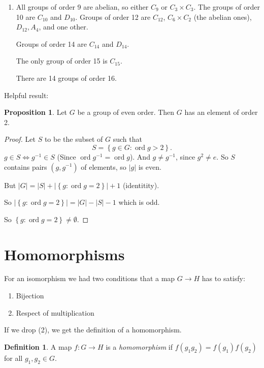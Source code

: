 \documentclass{article}
\theoremstyle{definition}
\newtheorem{definition}{Definition}
\newtheorem{proposition}{Proposition}
\DeclareMathOperator{\ord}{\text{ord}}
\begin{document}
\begin{enumerate}
\item All groups of order 9 are abelian, so either $C_9$ or $C_3 \times C_3$.
  The groups of order 10 are $C_{10}$ and $D_{10}$. Groups of order 12 are $C_{12}$, $ C_{6} \times C_2$ (the abelian ones), $D_{12},A_{4}$, and one other. 

  Groups of order 14 are $C_{14}$ and $D_{14}$. 

  The only group of order 15 is $C_{15}$.

  There are 14 groups of order 16.
\end{enumerate}

Helpful result:
\begin{proposition}
  Let $G$ be a group of even order. Then $G$ has an element of order 2.
\end{proposition}

\begin{proof}
  Let $S$ to be the subset of $G$ such that 
  \begin{equation*}
    S = \left\{ g \in G : \ord g > 2 \right\}.
  \end{equation*}
  $g \in S \iff g^{-1} \in S$ (Since $\ord g^{-1} = \ord g$). And $g \neq g^{-1}$, since $g^2 \neq e$. So $S$ contains pairs $(g,g^{-1})$ of elements, so $|g|$ is even. 

  But $|G|=|S| + |\left\{ g : \ord g=2 \right\}| + 1$ (identitity). 

  So $|\left\{ g : \ord g = 2 \right\}|=|G|-|S|-1$ which is odd. 

  So $\left\{ g : \ord g = 2 \right\} \neq \emptyset.$

\end{proof}


\section{Homomorphisms}

For an isomorphism we had two conditions that a map $G \rightarrow H$ has to satisfy:

\begin{enumerate}
  \item Bijection
  \item Respect of multiplication
\end{enumerate}

If we drop (2), we get the definition of a homomorphism.\\

\begin{definition}
  A map $f:G \rightarrow H$ is a \emph{homomorphism} if $f(g_1 g_2)=f(g_1)f(g_2)$ for all $g_1,g_2 \in G.$\\
\end{definition}
\end{document}
